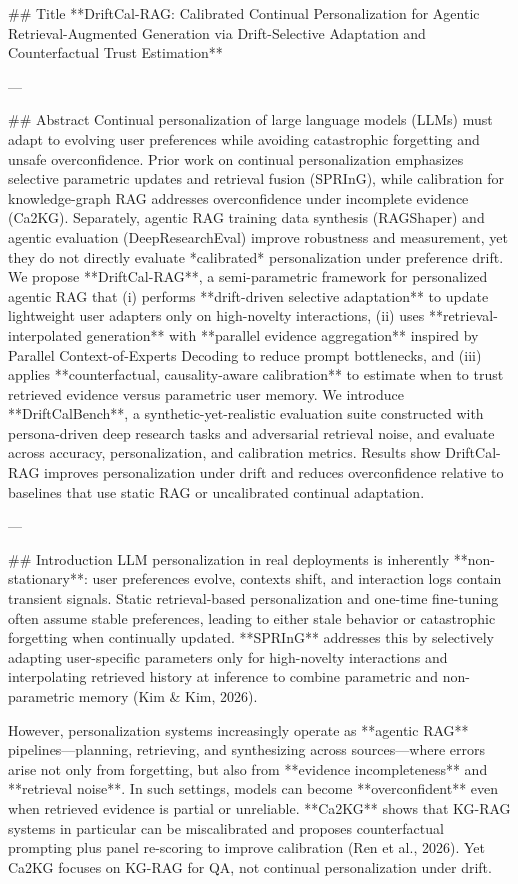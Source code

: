 ## Title  
**DriftCal-RAG: Calibrated Continual Personalization for Agentic Retrieval-Augmented Generation via Drift-Selective Adaptation and Counterfactual Trust Estimation**

---

## Abstract  
Continual personalization of large language models (LLMs) must adapt to evolving user preferences while avoiding catastrophic forgetting and unsafe overconfidence. Prior work on continual personalization emphasizes selective parametric updates and retrieval fusion (SPRInG), while calibration for knowledge-graph RAG addresses overconfidence under incomplete evidence (Ca2KG). Separately, agentic RAG training data synthesis (RAGShaper) and agentic evaluation (DeepResearchEval) improve robustness and measurement, yet they do not directly evaluate *calibrated* personalization under preference drift. We propose **DriftCal-RAG**, a semi-parametric framework for personalized agentic RAG that (i) performs **drift-driven selective adaptation** to update lightweight user adapters only on high-novelty interactions, (ii) uses **retrieval-interpolated generation** with **parallel evidence aggregation** inspired by Parallel Context-of-Experts Decoding to reduce prompt bottlenecks, and (iii) applies **counterfactual, causality-aware calibration** to estimate when to trust retrieved evidence versus parametric user memory. We introduce **DriftCalBench**, a synthetic-yet-realistic evaluation suite constructed with persona-driven deep research tasks and adversarial retrieval noise, and evaluate across accuracy, personalization, and calibration metrics. Results show DriftCal-RAG improves personalization under drift and reduces overconfidence relative to baselines that use static RAG or uncalibrated continual adaptation.

---

## Introduction  
LLM personalization in real deployments is inherently **non-stationary**: user preferences evolve, contexts shift, and interaction logs contain transient signals. Static retrieval-based personalization and one-time fine-tuning often assume stable preferences, leading to either stale behavior or catastrophic forgetting when continually updated. **SPRInG** addresses this by selectively adapting user-specific parameters only for high-novelty interactions and interpolating retrieved history at inference to combine parametric and non-parametric memory (Kim & Kim, 2026).  

However, personalization systems increasingly operate as **agentic RAG** pipelines—planning, retrieving, and synthesizing across sources—where errors arise not only from forgetting, but also from **evidence incompleteness** and **retrieval noise**. In such settings, models can become **overconfident** even when retrieved evidence is partial or unreliable. **Ca2KG** shows that KG-RAG systems in particular can be miscalibrated and proposes counterfactual prompting plus panel re-scoring to improve calibration (Ren et al., 2026). Yet Ca2KG focuses on KG-RAG for QA, not continual personalization under drift.

